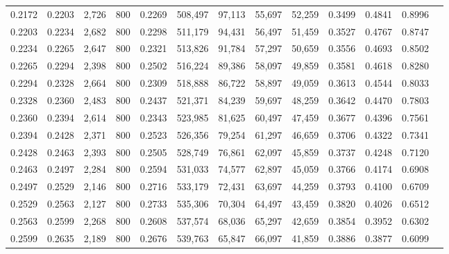 \begin{tabular}{rrrrrrrrrrrrr}
0.2172 & 0.2203 &  2,726 &   800 &                                     0.2269 & 508,497 &  97,113 &  55,697 &  52,259 & 0.3499 & 0.4841 & 0.8996 \\
0.2203 & 0.2234 &  2,682 &   800 &                                     0.2298 & 511,179 &  94,431 &  56,497 &  51,459 & 0.3527 & 0.4767 & 0.8747 \\
0.2234 & 0.2265 &  2,647 &   800 &                                     0.2321 & 513,826 &  91,784 &  57,297 &  50,659 & 0.3556 & 0.4693 & 0.8502 \\
0.2265 & 0.2294 &  2,398 &   800 &                                     0.2502 & 516,224 &  89,386 &  58,097 &  49,859 & 0.3581 & 0.4618 & 0.8280 \\
0.2294 & 0.2328 &  2,664 &   800 &                                     0.2309 & 518,888 &  86,722 &  58,897 &  49,059 & 0.3613 & 0.4544 & 0.8033 \\
0.2328 & 0.2360 &  2,483 &   800 &                                     0.2437 & 521,371 &  84,239 &  59,697 &  48,259 & 0.3642 & 0.4470 & 0.7803 \\
0.2360 & 0.2394 &  2,614 &   800 &                                     0.2343 & 523,985 &  81,625 &  60,497 &  47,459 & 0.3677 & 0.4396 & 0.7561 \\
0.2394 & 0.2428 &  2,371 &   800 &                                     0.2523 & 526,356 &  79,254 &  61,297 &  46,659 & 0.3706 & 0.4322 & 0.7341 \\
0.2428 & 0.2463 &  2,393 &   800 &                                     0.2505 & 528,749 &  76,861 &  62,097 &  45,859 & 0.3737 & 0.4248 & 0.7120 \\
0.2463 & 0.2497 &  2,284 &   800 &                                     0.2594 & 531,033 &  74,577 &  62,897 &  45,059 & 0.3766 & 0.4174 & 0.6908 \\
0.2497 & 0.2529 &  2,146 &   800 &                                     0.2716 & 533,179 &  72,431 &  63,697 &  44,259 & 0.3793 & 0.4100 & 0.6709 \\
0.2529 & 0.2563 &  2,127 &   800 &                                     0.2733 & 535,306 &  70,304 &  64,497 &  43,459 & 0.3820 & 0.4026 & 0.6512 \\
0.2563 & 0.2599 &  2,268 &   800 &                                     0.2608 & 537,574 &  68,036 &  65,297 &  42,659 & 0.3854 & 0.3952 & 0.6302 \\
0.2599 & 0.2635 &  2,189 &   800 &                                     0.2676 & 539,763 &  65,847 &  66,097 &  41,859 & 0.3886 & 0.3877 & 0.6099 \\

\end{tabular}
